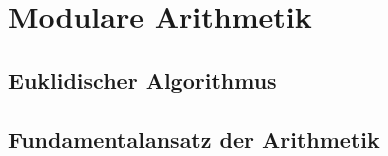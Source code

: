 \section{Modulare Arithmetik}

\subsection{Euklidischer Algorithmus}

\subsection{Fundamentalansatz der Arithmetik}
